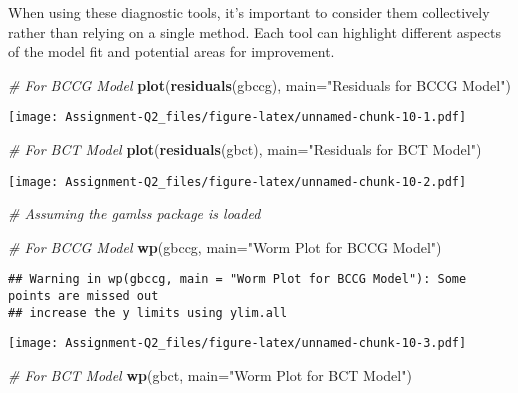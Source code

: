 \documentclass[
]{article}
\newenvironment{Shaded}{\begin{snugshade}}{\end{snugshade}}
\newcommand{\AttributeTok}[1]{\textcolor[rgb]{0.13,0.29,0.53}{#1}}
\newcommand{\CommentTok}[1]{\textcolor[rgb]{0.56,0.35,0.01}{\textit{#1}}}
\newcommand{\FunctionTok}[1]{\textcolor[rgb]{0.13,0.29,0.53}{\textbf{#1}}}
\newcommand{\NormalTok}[1]{#1}
\newcommand{\StringTok}[1]{\textcolor[rgb]{0.31,0.60,0.02}{#1}}
\begin{document}
When using these diagnostic tools, it's important to consider them
collectively rather than relying on a single method. Each tool can
highlight different aspects of the model fit and potential areas for
improvement.

\begin{Shaded}
\begin{Highlighting}[]
\CommentTok{\# For BCCG Model}
\FunctionTok{plot}\NormalTok{(}\FunctionTok{residuals}\NormalTok{(gbccg), }\AttributeTok{main=}\StringTok{"Residuals for BCCG Model"}\NormalTok{)}
\end{Highlighting}
\end{Shaded}

\texttt{[image: Assignment-Q2\_files/figure-latex/unnamed-chunk-10-1.pdf]}

\begin{Shaded}
\begin{Highlighting}[]
\CommentTok{\# For BCT Model}
\FunctionTok{plot}\NormalTok{(}\FunctionTok{residuals}\NormalTok{(gbct), }\AttributeTok{main=}\StringTok{"Residuals for BCT Model"}\NormalTok{)}
\end{Highlighting}
\end{Shaded}

\texttt{[image: Assignment-Q2\_files/figure-latex/unnamed-chunk-10-2.pdf]}

\begin{Shaded}
\begin{Highlighting}[]
\CommentTok{\# Assuming the \textquotesingle{}gamlss\textquotesingle{} package is loaded}

\CommentTok{\# For BCCG Model}
\FunctionTok{wp}\NormalTok{(gbccg, }\AttributeTok{main=}\StringTok{"Worm Plot for BCCG Model"}\NormalTok{)}
\end{Highlighting}
\end{Shaded}

\begin{verbatim}
## Warning in wp(gbccg, main = "Worm Plot for BCCG Model"): Some points are missed out 
## increase the y limits using ylim.all
\end{verbatim}

\texttt{[image: Assignment-Q2\_files/figure-latex/unnamed-chunk-10-3.pdf]}

\begin{Shaded}
\begin{Highlighting}[]
\CommentTok{\# For BCT Model}
\FunctionTok{wp}\NormalTok{(gbct, }\AttributeTok{main=}\StringTok{"Worm Plot for BCT Model"}\NormalTok{)}
\end{Highlighting}
\end{Shaded}
\end{document}
